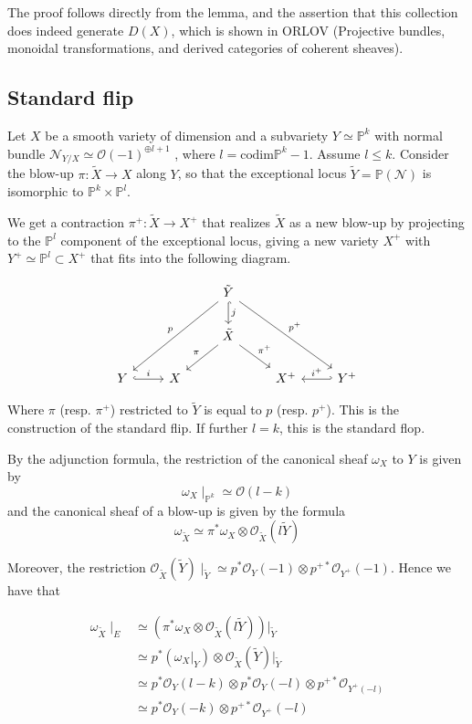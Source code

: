 The proof follows directly from the lemma, and the assertion that this collection does indeed generate $D(X)$, which is shown in ORLOV (Projective bundles, monoidal transformations, and derived categories of coherent sheaves).

\subsection{Standard flip}

Let $X$ be a smooth variety of dimension and a subvariety $Y \simeq \mathbb{P}^k$ with normal bundle $\mathcal{ N}_{Y/X}\simeq \mathcal{O}(-1)^{\oplus l+1}$ , where  $l = \mathrm{codim}\mathbb{P}^{k}-1$. Assume $l \leq k$. Consider the blow-up $\pi:\tilde{X}\to X$ along $Y$, so that the exceptional locus $\tilde{Y} = \mathbb{P}(\mathcal{N})$ is isomorphic to $\mathbb{P}^{k}\times \mathbb{P}^l$. 

We get a contraction $\pi^{+}: \tilde{X}\to X^+$ that realizes $\tilde{X}$ as a new blow-up by projecting to the $\mathbb{P}^{l}$ component of the exceptional locus, giving a new variety $X^+$ with $Y^{+}\simeq \mathbb{P}^{l}\subset X^{+}$ that fits into the following diagram. 

\[\begin{tikzcd}
	&& {\tilde Y} \\
	& {} & {\tilde X} \\
	Y & X && {X^+} & {Y^+}
	\arrow["{i^+}"', hook', from=3-5, to=3-4]
	\arrow["i", hook, from=3-1, to=3-2]
	\arrow["\pi"', from=2-3, to=3-2]
	\arrow["{\pi^+}", from=2-3, to=3-4]
	\arrow["j", hook, from=1-3, to=2-3]
	\arrow["p"', from=1-3, to=3-1]
	\arrow["{p^+}", from=1-3, to=3-5]
\end{tikzcd}\]

Where $\pi$ (resp. $\pi^+$) restricted to $\tilde{Y}$ is equal to $p$ (resp. $p^+$). This is the construction of the standard flip. If further $l = k$, this is the standard flop. 

By the adjunction formula, the restriction of the canonical sheaf $\omega_X$ to $Y$ is given by $$
\omega_{X}\mid_{\mathbb{P}^{k}} \simeq \mathcal{O}(l-k)$$ and the canonical sheaf of a blow-up is given by the formula $$\omega_{\tilde{X}} \simeq \pi^{*}\omega_{X}\otimes \mathcal{O}_{\tilde{X}}(l \tilde{Y})$$

Moreover, the restriction $\mathcal{O}_{\tilde{X}}(\tilde{Y}) \mid_{\tilde{Y}} \simeq p^{*}\mathcal{O}_{Y}(-1)\otimes p^{+*}\mathcal{O}_{Y^+}(-1)$. Hence we have that 

\begin{align*}
\omega_{\tilde{X}}\mid_{E} &\simeq \left( \pi^{*}\omega_{X}\otimes \mathcal{O}_{\tilde{X}}(l \tilde{Y}) \right) \Big|_{\tilde{Y}}  \\
&\simeq p^{*}(\omega_{X}\big|_{Y})\otimes  \mathcal{O}_{\tilde{X}}( \tilde{Y})\Big|_{\tilde{Y}}  \\
&\simeq p^{*} \mathcal{O}_Y(l-k) \otimes p^{*}\mathcal{O}_{Y}(-l) \otimes p^{+*}\mathcal{O}_{Y^{+}(-l)} \\
&\simeq p^{*} \mathcal{O}_Y(-k) \otimes p^{+*}\mathcal{O}_{Y^+}(-l) 
\end{align*}

